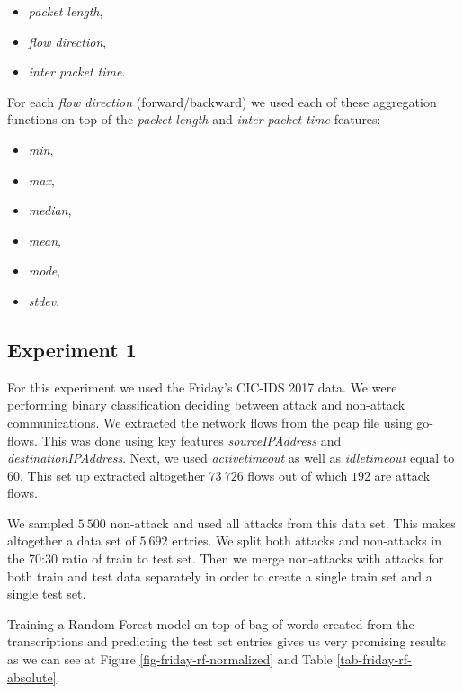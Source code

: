 \documentclass{article}
\begin{document}
\begin{itemize}
    \item \textit{packet length},
    \item \textit{flow direction},
    \item \textit{inter packet time}.
\end{itemize}

\noindent For each \textit{flow direction} (forward/backward) we used each of these aggregation functions on top of the \textit{packet length} and \textit{inter packet time} features:

\begin{itemize}
    \item \textit{min},
    \item \textit{max},
    \item \textit{median},
    \item \textit{mean},
    \item \textit{mode},
    \item \textit{stdev}.
\end{itemize}



\subsection{Experiment 1}

For this experiment we used the Friday's CIC-IDS 2017 data. We were performing binary classification deciding between attack and non-attack communications. We extracted the network flows from the pcap file using go-flows. This was done using key features \textit{sourceIPAddress} and \textit{destinationIPAddress}. Next, we used \textit{active\textunderscore timeout} as well as \textit{idle\textunderscore timeout} equal to 60. This set up extracted altogether $73\ 726$ flows out of which $192$ are attack flows.

We sampled $5\ 500$ non-attack and used all attacks from this data set. This makes altogether a data set of $5\ 692$ entries. We split both attacks and non-attacks in the 70:30 ratio of train to test set. Then we merge non-attacks with attacks for both train and test data separately in order to create a single train set and a single test set.

Training a Random Forest model on top of bag of words created from the transcriptions and predicting the test set entries gives us very promising results as we can see at Figure \ref{fig-friday-rf-normalized} and Table \ref{tab-friday-rf-absolute}.
\end{document}
